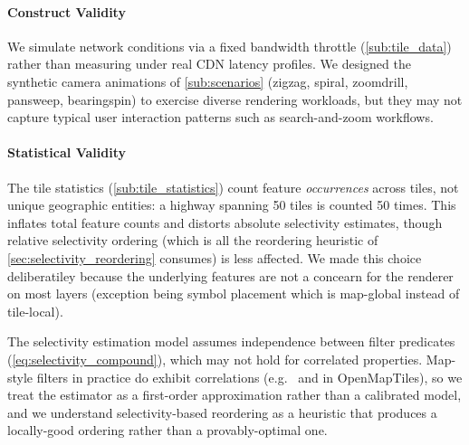 \paragraph{Construct Validity}
We simulate network conditions via a fixed bandwidth throttle (\cref{sub:tile_data}) rather than measuring under real \ac{CDN} latency profiles.
We designed the synthetic camera animations of \cref{sub:scenarios} (zigzag, spiral, zoomdrill, pansweep, bearingspin) to exercise diverse rendering workloads, but they may not capture typical user interaction patterns such as search-and-zoom workflows.

\paragraph{Statistical Validity}
The tile statistics (\cref{sub:tile_statistics}) count feature \emph{occurrences} across tiles, not unique geographic entities: a highway spanning 50 tiles is counted 50 times.
This inflates total feature counts and distorts absolute selectivity estimates, though relative selectivity ordering (which is all the reordering heuristic of \cref{sec:selectivity_reordering} consumes) is less affected.
We made this choice deliberatiley because the underlying features are not a concearn for the renderer on most layers (exception being symbol placement which is map-global instead of tile-local).

The selectivity estimation model assumes independence between filter predicates (\cref{eq:selectivity_compound}), which may not hold for correlated properties.
Map-style filters in practice do exhibit correlations (e.g.\  and  in OpenMapTiles), so we treat the estimator as a first-order approximation rather than a calibrated model, and we understand selectivity-based reordering as a heuristic that produces a locally-good ordering rather than a provably-optimal one.

